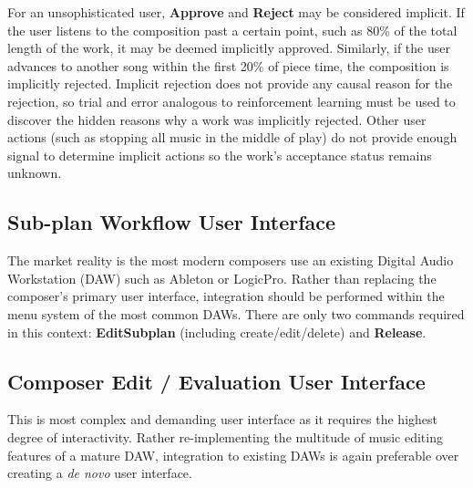 \documentclass[final,authoryear,5p,times,twocolumn]{elsarticle}
\begin{document}
For an unsophisticated user, \textbf{Approve} and \textbf{Reject} may be considered implicit. If the user listens to the composition past a certain point, such as 80\% of the total length of the work, it may be deemed implicitly approved. Similarly, if the user advances to another song within the first 20\% of piece time, the composition is implicitly rejected. Implicit rejection does not provide any causal reason for the rejection, so trial and error analogous to reinforcement learning must be used to discover the hidden reasons why a work was implicitly rejected. Other user actions (such as stopping all music in the middle of play) do not provide enough signal to determine implicit actions so the work's acceptance status remains unknown.

\subsection{Sub-plan Workflow User Interface}

The market reality is the most modern composers use an existing Digital Audio Workstation (DAW) such as Ableton or LogicPro. Rather than replacing the composer's primary user interface, integration should be performed within the menu system of the most common DAWs. There are only two commands required in this context: \textbf{EditSubplan} (including create/edit/delete) and \textbf{Release}. 


\subsection{Composer Edit / Evaluation User Interface}

This is most complex and demanding user interface as it requires the highest degree of interactivity. Rather re-implementing the multitude of music editing features of a mature DAW, integration to existing DAWs is again preferable over creating a \textit{de novo} user interface. 
\end{document}
